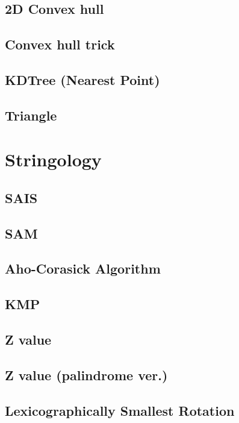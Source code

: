 \documentclass[a4paper,10pt,twocolumn,oneside]{article}
\begin{document}
\subsection{2D Convex hull}


\subsection{Convex hull trick}


\subsection{KDTree (Nearest Point)}


\subsection{Triangle}


\section{Stringology}

%

\subsection{SAIS}


\subsection{SAM}


\subsection{Aho-Corasick Algorithm}


\subsection{KMP}


\subsection{Z value}


\subsection{Z value (palindrome ver.)}


\subsection{Lexicographically Smallest Rotation}

\end{document}
